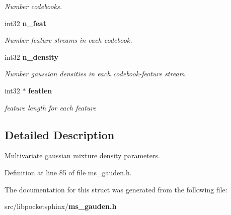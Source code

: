 \begin{DoxyCompactItemize}
\begin{DoxyCompactList}\small\item\em Number codebooks. \end{DoxyCompactList}\item 
int32 {\bf n\-\_\-feat}\label{structgauden__t_a6dea221962b4a278dbae4806925a7be0}

\begin{DoxyCompactList}\small\item\em Number feature streams in each codebook. \end{DoxyCompactList}\item 
int32 {\bf n\-\_\-density}\label{structgauden__t_ab5104d8fa59bc94b12b36104dd4c19ac}

\begin{DoxyCompactList}\small\item\em Number gaussian densities in each codebook-\/feature stream. \end{DoxyCompactList}\item 
int32 $\ast$ {\bf featlen}\label{structgauden__t_aca099d830de926e628ac0b523046b32c}

\begin{DoxyCompactList}\small\item\em feature length for each feature \end{DoxyCompactList}\end{DoxyCompactItemize}


\subsection{Detailed Description}
Multivariate gaussian mixture density parameters. 

Definition at line 85 of file ms\-\_\-gauden.\-h.



The documentation for this struct was generated from the following file\-:\begin{DoxyCompactItemize}
\item 
src/libpocketsphinx/{\bf ms\-\_\-gauden.\-h}\end{DoxyCompactItemize}
